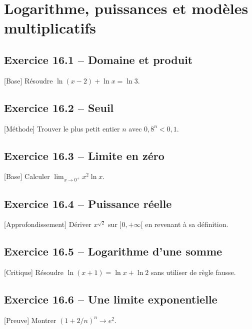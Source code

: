 \chapter{Logarithme, puissances et modèles multiplicatifs}
\section*{Exercice 16.1 -- Domaine et produit}
[Base] Résoudre $\ln(x-2)+\ln x=\ln3$.

\section*{Exercice 16.2 -- Seuil}
[Méthode] Trouver le plus petit entier $n$ avec $0{,}8^n<0{,}1$.

\section*{Exercice 16.3 -- Limite en zéro}
[Base] Calculer $\lim_{x\to0^+}x^2\ln x$.

\section*{Exercice 16.4 -- Puissance réelle}
[Approfondissement] Dériver $x^{\sqrt2}$ sur $]0,+\infty[$ en revenant à sa définition.

\section*{Exercice 16.5 -- Logarithme d’une somme}
[Critique] Résoudre $\ln(x+1)=\ln x+\ln2$ sans utiliser de règle fausse.

\section*{Exercice 16.6 -- Une limite exponentielle}
[Preuve] Montrer $(1+2/n)^n\to e^2$.
